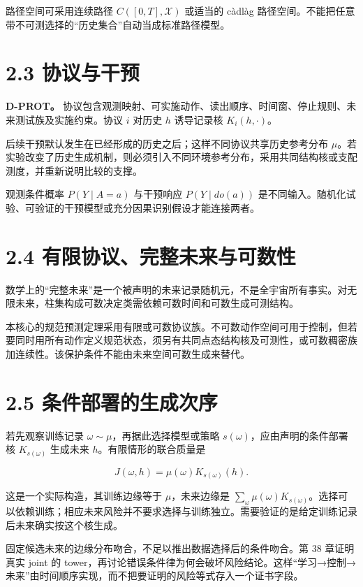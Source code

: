\documentclass[
  11pt,
  oneside]{book}
\begin{document}
路径空间可采用连续路径 \(C([0,T],\mathcal X)\) 或适当的 càdlàg 路径空间。不能把任意带不可测选择的``历史集合''自动当成标准路径模型。

\section{2.3 协议与干预}\label{ux534fux8baeux4e0eux5e72ux9884}

\textbf{D-PROT。} 协议包含观测映射、可实施动作、读出顺序、时间窗、停止规则、未来测试族及实施约束。协议 \(i\) 对历史 \(h\) 诱导记录核 \(K_i(h,\cdot)\)。

后续干预默认发生在已经形成的历史之后；这样不同协议共享历史参考分布 \(\mu\)。若实验改变了历史生成机制，则必须引入不同环境参考分布，采用共同结构核或支配测度，并重新说明比较的支撑。

观测条件概率 \(P(Y\mid A=a)\) 与干预响应 \(P(Y\mid do(a))\) 是不同输入。随机化试验、可验证的干预模型或充分因果识别假设才能连接两者。

\section{2.4 有限协议、完整未来与可数性}\label{ux6709ux9650ux534fux8baeux5b8cux6574ux672aux6765ux4e0eux53efux6570ux6027}

数学上的``完整未来''是一个被声明的未来记录随机元，不是全宇宙所有事实。对无限未来，柱集构成可数决定类需依赖可数时间和可数生成可测结构。

本核心的规范预测定理采用有限或可数协议族。不可数动作空间可用于控制，但若要同时用所有动作定义规范状态，须另有共同点态结构核及可测性，或可数稠密族加连续性。该保护条件不能由未来空间可数生成来替代。

\section{2.5 条件部署的生成次序}\label{ux6761ux4ef6ux90e8ux7f72ux7684ux751fux6210ux6b21ux5e8f}

若先观察训练记录 \(\omega\sim\mu\)，再据此选择模型或策略 \(s(\omega)\)，应由声明的条件部署核 \(K_{s(\omega)}\) 生成未来 \(h\)。有限情形的联合质量是

\[J(\omega,h)=\mu(\omega)K_{s(\omega)}(h).\]

这是一个实际构造，其训练边缘等于 \(\mu\)，未来边缘是 \(\sum_\omega\mu(\omega)K_{s(\omega)}\)。选择可以依赖训练；相应未来风险并不要求选择与训练独立。需要验证的是给定训练记录后未来确实按这个核生成。

固定候选未来的边缘分布吻合，不足以推出数据选择后的条件吻合。第 38 章证明真实 joint 的 tower，再讨论错误条件律为何会破坏风险结论。这样``学习→控制→未来''由时间顺序实现，而不把要证明的风险等式存入一个证书字段。
\end{document}

